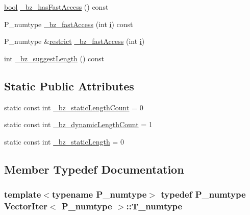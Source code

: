 \begin{DoxyCompactItemize}
\item 
\hyperlink{compiler_8h_abb452686968e48b67397da5f97445f5b}{bool} \hyperlink{classVectorIter_a04efe8ca2840e09f02310f6e00de9427}{\+\_\+bz\+\_\+has\+Fast\+Access} () const 
\item 
P\+\_\+numtype \hyperlink{classVectorIter_a8935baef7d8ddbbe20c656d583cbb359}{\+\_\+bz\+\_\+fast\+Access} (int \hyperlink{indexexpr_8h_aabd77643995707c185e95c8cb2782c81}{i}) const 
\item 
P\+\_\+numtype \&\hyperlink{compiler_8h_a080abdcb9c02438f1cd2bb707af25af8}{restrict} \hyperlink{classVectorIter_a186a9a1059686d28ca456dd309679c97}{\+\_\+bz\+\_\+fast\+Access} (int \hyperlink{indexexpr_8h_aabd77643995707c185e95c8cb2782c81}{i})
\item 
int \hyperlink{classVectorIter_a3e911c462211ff532ae46e543125c1cf}{\+\_\+bz\+\_\+suggest\+Length} () const 
\end{DoxyCompactItemize}
\subsection*{Static Public Attributes}
\begin{DoxyCompactItemize}
\item 
static const int \hyperlink{classVectorIter_a5c1484d75f0ef56a0e347a5cd654a1fd}{\+\_\+bz\+\_\+static\+Length\+Count} = 0
\item 
static const int \hyperlink{classVectorIter_a5584656ea9b435ae2ee3deb74213dc06}{\+\_\+bz\+\_\+dynamic\+Length\+Count} = 1
\item 
static const int \hyperlink{classVectorIter_af0a294e404a2578006da378ff14f4458}{\+\_\+bz\+\_\+static\+Length} = 0
\end{DoxyCompactItemize}


\subsection{Member Typedef Documentation}
\hypertarget{classVectorIter_aac3a64c6fd8651eff6039cb346be1af1}{}
\subsubsection[{T\+\_\+numtype}]{\setlength{\rightskip}{0pt plus 5cm}template$<$typename P\+\_\+numtype$>$ typedef P\+\_\+numtype {\bf Vector\+Iter}$<$ P\+\_\+numtype $>$\+::{\bf T\+\_\+numtype}}\label{classVectorIter_aac3a64c6fd8651eff6039cb346be1af1}



